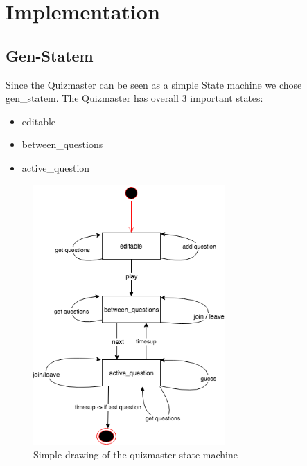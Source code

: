\documentclass[12pt,a4paper]{article}
\begin{document}
\section{Implementation}
\subsection{Gen-Statem}
Since the Quizmaster can be seen as a simple State machine we chose gen\_statem.
The Quizmaster has overall 3 important states:
\begin{itemize}
	\item editable
	\item between\_questions
	\item active\_question
\end{itemize} 

\begin{figure}[!htb]
\begin{center}
		\includegraphics[width=0.65\textwidth]{images/Quizmaster}
\end{center}
	\caption{Simple drawing of the quizmaster state machine}
\end{figure}

\newpage
\end{document}
